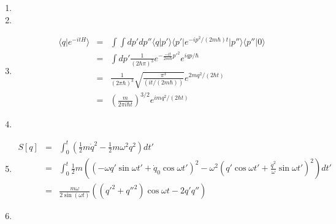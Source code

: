 \documentclass[12pt,a4paper]{article}
\begin{document}
\begin{enumerate}
\item




\item






\item
\begin{eqnarray*}
	\langle q \vert e^{-itH} \rangle &=& \int\int  d p'  d p'' \langle q\vert p' \rangle \langle p'  \vert e^{-i p^2/(2m\hbar) t} \vert p''\rangle \langle p'' \vert 0 \rangle \\
	&=& \int  d p' \frac{1}{(2\hbar \pi)^3} e^{-\frac{-it}{2m\hbar} p'^2} e^{iqp/\hbar} \\
	&=& \frac{1}{(2\pi \hbar)^3} \sqrt{\frac{\pi^3}{(it/(2 m\hbar))}} e^{2mq^2/(2\hbar t)} \\
	&=& \left( \frac{m}{2\pi i\hbar t} \right)^{3/2} e^{imq^2/(2\hbar t)}
\end{eqnarray*}



\item







\item

\begin{eqnarray*}
	S[q] &=& \int_0^t \left( \frac 12 m\dot q^2 - \frac 1 2 m \omega^2  q^2 \right) d t' \\
	&=& \int_0^t \frac 1 2 m\left( (-\omega q' \sin\omega t' + \dot q_0 \cos\omega t')^2 -  \omega^2 (q' \cos\omega t' + \frac{\dot q^2}{\omega} \sin\omega t')^2 \right) d  t'\\
	&=& \frac{m\omega}{2\sin(\omega t)} \left( (q'^2 + q''^2)\cos\omega t - 2q'q'' \right)
\end{eqnarray*}







\item


\end{enumerate}
\end{document}
